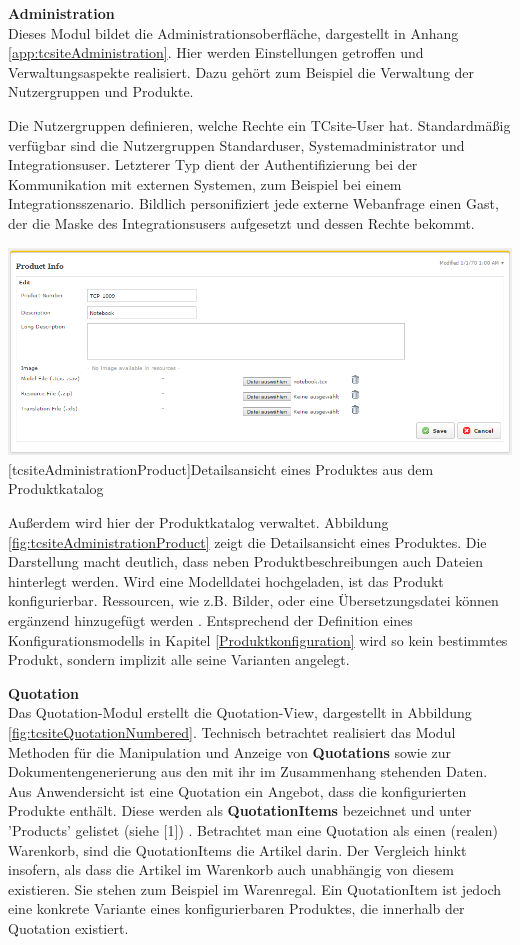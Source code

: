 \documentclass[11pt, a4paper, titlepage, listof=totoc, bibliography=totoc, index=totoc, twoside, openright, headings=normal]{scrreprt}
\begin{document}
\textbf{Administration}\\
Dieses Modul bildet die Administrationsoberfläche, dargestellt in Anhang \ref{app:tcsiteAdministration}. Hier werden Einstellungen getroffen und Verwaltungsaspekte realisiert. Dazu gehört zum Beispiel die Verwaltung der Nutzergruppen und Produkte.

Die Nutzergruppen definieren, welche Rechte ein TCsite-User hat. Standardmäßig verfügbar sind die Nutzergruppen \glqq Standarduser\grqq{}, \glqq Systemadministrator\grqq{} und \glqq Integrationsuser\grqq{}. Letzterer Typ dient der Authentifizierung bei der Kommunikation mit externen Systemen, zum Beispiel bei einem Integrationsszenario. Bildlich personifiziert jede externe Webanfrage einen Gast, der die Maske des Integrationsusers aufgesetzt und dessen Rechte bekommt.

\vspace{1em}
\begin{minipage}{\linewidth}
	\centering
	\includegraphics[width=0.6\linewidth]{Abbildungen/tcsiteAdministrationProduct.PNG}
	[tcsiteAdministrationProduct]{Detailsansicht eines Produktes aus dem Produktkatalog}
	\label{fig:tcsiteAdministrationProduct}
\end{minipage}
\vspace{1em}

Außerdem wird hier der Produktkatalog verwaltet. Abbildung \ref{fig:tcsiteAdministrationProduct} zeigt die Detailsansicht eines Produktes. Die Darstellung macht deutlich, dass neben Produktbeschreibungen auch Dateien hinterlegt werden. Wird eine Modelldatei hochgeladen, ist das Produkt konfigurierbar. Ressourcen, wie z.B. Bilder, oder eine Übersetzungsdatei können ergänzend hinzugefügt werden \citep{tactonTCsiteReferenceManual}. Entsprechend der Definition eines Konfigurationsmodells in Kapitel \ref{Produktkonfiguration} wird so kein bestimmtes Produkt, sondern implizit alle seine Varianten angelegt.

\textbf{Quotation}\\
Das Quotation-Modul erstellt die Quotation-View, dargestellt in Abbildung \ref{fig:tcsiteQuotationNumbered}. Technisch betrachtet realisiert das Modul Methoden für die Manipulation und Anzeige von \textbf{Quotations} sowie zur Dokumentengenerierung aus den mit ihr im Zusammenhang stehenden Daten. Aus Anwendersicht ist eine Quotation ein Angebot, dass die konfigurierten Produkte enthält. Diese werden als \textbf{QuotationItems} bezeichnet und unter 'Products' gelistet (siehe [1]) \citep{tactonTCsiteDevelopmentManual}. Betrachtet man eine Quotation als einen (realen) Warenkorb, sind die QuotationItems die Artikel darin. Der Vergleich hinkt insofern, als dass die Artikel im Warenkorb auch unabhängig von diesem existieren. Sie stehen zum Beispiel im Warenregal. Ein QuotationItem ist jedoch eine konkrete Variante eines konfigurierbaren Produktes, die innerhalb der Quotation existiert.
\end{document}
